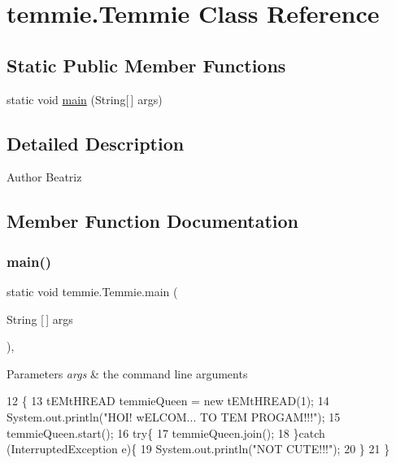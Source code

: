 \hypertarget{classtemmie_1_1_temmie}{}\section{temmie.\+Temmie Class Reference}
\label{classtemmie_1_1_temmie}
\subsection*{Static Public Member Functions}
\begin{DoxyCompactItemize}
\item 
static void \mbox{\hyperlink{classtemmie_1_1_temmie_a582f80ec0be1b0cf0d81ea9a8fa36709}{main}} (String\mbox{[}$\,$\mbox{]} args)
\end{DoxyCompactItemize}


\subsection{Detailed Description}
\begin{DoxyAuthor}{Author}
Beatriz 
\end{DoxyAuthor}


\subsection{Member Function Documentation}
\mbox{\label{classtemmie_1_1_temmie_a582f80ec0be1b0cf0d81ea9a8fa36709}} 
\subsubsection{\texorpdfstring{main()}{main()}}
{\footnotesize\ttfamily static void temmie.\+Temmie.\+main (\begin{DoxyParamCaption}\item[{String \mbox{[}$\,$\mbox{]}}]{args }\end{DoxyParamCaption})\hspace{0.3cm}{\ttfamily [inline]}, {\ttfamily [static]}}


\begin{DoxyParams}{Parameters}
{\em args} & the command line arguments \\
\hline
\end{DoxyParams}

\begin{DoxyCode}
12                                            \{
13         tEMtHREAD temmieQueen = \textcolor{keyword}{new} tEMtHREAD(1);
14         System.out.println(\textcolor{stringliteral}{"HOI! wELCOM... TO TEM PROGAM!!!"});
15         temmieQueen.start();
16         \textcolor{keywordflow}{try}\{
17             temmieQueen.join();
18         \}\textcolor{keywordflow}{catch} (InterruptedException e)\{
19             System.out.println(\textcolor{stringliteral}{"NOT CUTE!!!"});
20         \}
21     \}
\end{DoxyCode}
